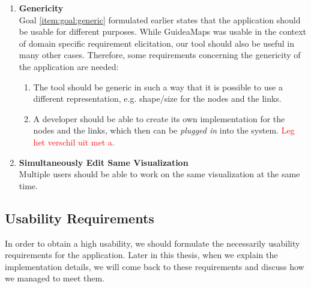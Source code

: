 \begin{enumerate}[label=\textbf{\arabic*}., ref=\arabic*]
	\item \textbf{Genericity\label{item:genericity}} \hfill \\
	Goal \ref{item:goal:generic} formulated earlier states that the application should be usable for different purposes. While GuideaMaps was usable in the context of domain specific requirement elicitation, our tool should also be useful in many other cases. Therefore, some requirements concerning the genericity of the application are needed:
  	\begin{enumerate}
		\item The tool should be generic in such a way that it is possible to use a different representation, e.g. shape/size for the nodes and the links.
		\item A developer should be able to create its own implementation for the nodes and the links, which then can be \textit{plugged in} into the system. \textcolor{red}{Leg het verschil uit met a.}
	\end{enumerate}
	
	\item \textbf{Simultaneously Edit Same Visualization\label{item:work-simultaneously}} \hfill \\
	Multiple users should be able to work on the same visualization at the same time.
  
\end{enumerate}




\subsection{Usability Requirements}\label{sec:usability-requirements}
In order to obtain a high usability, we should formulate the necessarily usability requirements for the application. Later in this thesis, when we explain the implementation details, we will come back to these requirements and discuss how we managed to meet them.

